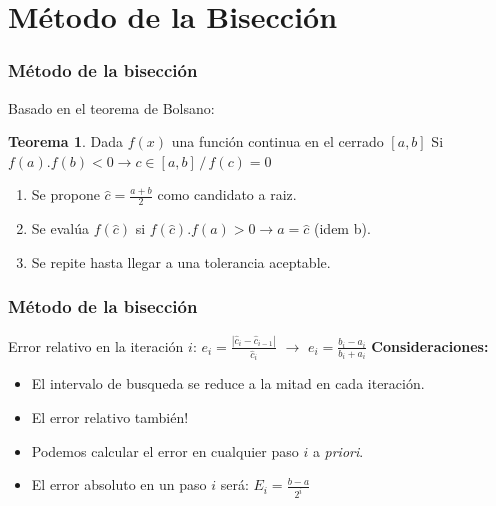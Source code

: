 \documentclass[xcolor=svgnames]{beamer} %
\theoremstyle{plain}
\renewcommand{\textbf}[1]{{\bfseries\textcolor{redUnq2}{#1}}}
\theoremstyle{definition}
\newtheorem{teor}{Teorema}
\begin{document}
\section{Método de la Bisección}
\begin{frame}
\frametitle{Método de la bisección}

Basado en el teorema de Bolsano:

\begin{tcolorbox}
\begin{teor}
	Dada $f(x)$ una función continua en el cerrado $[a,b]$ Si $f(a).f(b)<0 \rightarrow c \in [a,b]\, /\, f(c)=0$

\end{teor}
\end{tcolorbox}\vspace{12pt}

\begin{enumerate}
  \item Se propone $\hat c = \frac{a+b}{2} $ como candidato a raiz.
  \item Se evalúa $f(\hat c)$ si $f(\hat c).f(a)>0 \rightarrow  a=\hat c$ (idem b). 
  \item  Se repite hasta llegar a una tolerancia aceptable.
\end{enumerate}

\end{frame}

\begin{frame}
\frametitle{Método de la bisección}

Error relativo en la iteración $i$: $e_i = \frac{|\hat c_i-\hat c_{i-1}|}{\hat c_i} $ $\rightarrow$ $\boxed{ e_i= \frac{b_i-a_i}{b_i+a_i}}$\vspace{10pt}
\pause
\textbf{Consideraciones:}
\begin{itemize}
\pause
\item El intervalo de busqueda se reduce a la mitad en cada iteración.
\pause
\item El error relativo también!
\pause
\item Podemos calcular el error en cualquier paso $i$ a \textit{priori}.
\pause
\item El error absoluto en un paso $i$ será: $E_i = \frac{b-a}{2^i}$
\end{itemize}

\end{frame}
\end{document}
